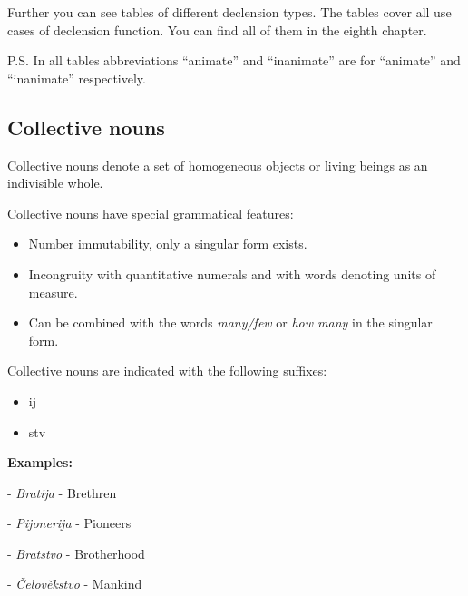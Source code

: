 Further you can see tables of different declension types. The tables cover all use cases of declension function. You can find all of them in the eighth chapter.


P.S. In all tables abbreviations “\gls{animate}” and “\gls{inanimate}” are for “animate” and “inanimate” respectively.


\subsection{Collective nouns}

Collective nouns denote a set of homogeneous objects or living beings as an indivisible whole.

Collective nouns have special grammatical features:

\begin{itemize}
	\item Number immutability, only a singular form exists.
	\item Incongruity with quantitative numerals and with words denoting units of measure.
	\item Can be combined with the words \textit{many/few} or \textit{how many} in the singular form.
\end{itemize}

Collective nouns are indicated with the following suffixes:

\begin{itemize}
	\item ij
	\item stv
\end{itemize}

\textbf{Examples:}

- \textit{Bratija} - Brethren

- \textit{Pijonerija} - Pioneers

- \textit{Bratstvo} - Brotherhood

- \textit{Čelověkstvo} - Mankind



